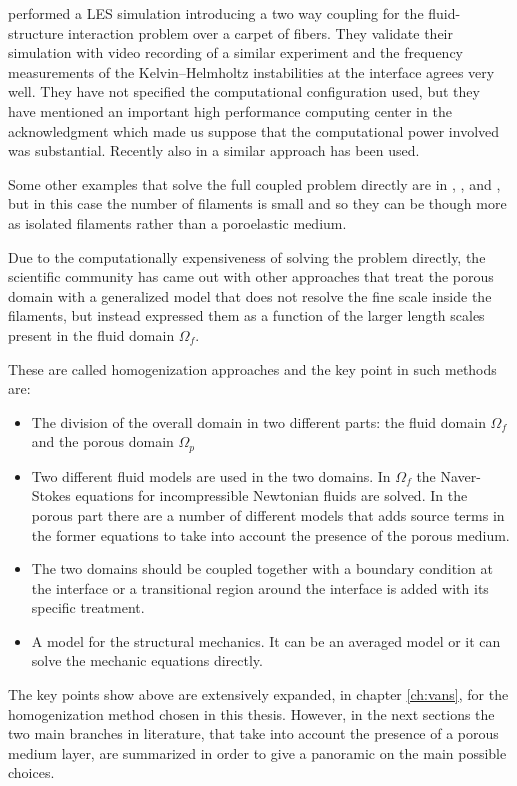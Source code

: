 \citet{dupont2010modelling} performed a LES simulation introducing a two way coupling for the fluid-structure interaction problem over a carpet of fibers. They validate their simulation with video recording of a similar experiment and the frequency measurements of the Kelvin–Helmholtz instabilities at the interface agrees very well.
They have not specified the computational configuration used, but they have mentioned an important high performance computing center in the acknowledgment which made us suppose that the computational power involved was substantial.
Recently also in \citet{marjoribanks2017does} a similar approach has been used.

Some other examples that solve the full coupled problem directly are in \citet{monti2017large}, \citet{pinelli2017pelskin}, \citet{favier2017pelskin} and \citet{revell2017pelskin}, but in this case the number of filaments is small and so they can be though more as isolated filaments rather than a poroelastic medium.

Due to the computationally expensiveness of solving the problem directly, the scientific community has came out with other approaches that treat the porous domain with a generalized model that does not resolve the fine scale inside the filaments, but instead expressed them as a function of the larger length scales present in the fluid domain $\Omega_{f}$.

These are called homogenization approaches and the key point in such methods are:
\begin{itemize}
	\item The division of the overall domain in two different parts: the fluid domain $\Omega_{f}$ and the porous domain $\Omega_{p}$
	\item Two different fluid models are used in the two domains. In $\Omega_{f}$ the Naver-Stokes equations for incompressible Newtonian fluids are solved. In the porous part there are a number of different models that adds source terms in the former equations to take into account the presence of the porous medium.
	\item The two domains should be coupled together with a boundary condition at the interface or a transitional region around the interface is added with its specific treatment.
	\item A model for the structural mechanics. It can be an averaged model or it can solve the mechanic equations directly.
\end{itemize}

The key points show above are extensively expanded, in chapter \ref{ch:vans}, for the homogenization method chosen in this thesis.
However, in the next sections the two main branches in literature, that take into account the presence of a porous medium layer, are summarized in order to give a panoramic on the main possible choices.


